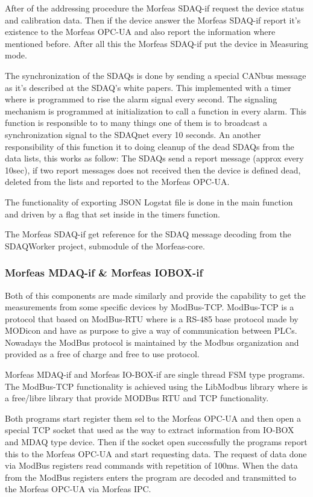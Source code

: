 \documentclass{article}
\begin{document}
After of the addressing procedure the Morfeas SDAQ-if request the device status and calibration data. Then if the device answer the Morfeas SDAQ-if report it's existence to the Morfeas OPC-UA
and also report the information where mentioned before. After all this the Morfeas SDAQ-if put the device in Measuring mode.

The synchronization of the SDAQs is done by sending a special CANbus message as it's described at the SDAQ's white papers. This implemented with a timer where is programmed to rise the alarm signal every second.
The signaling mechanism is programmed at initialization to call a function in every alarm. This function is responsible to to many things one of them is to broadcast a synchronization signal to the SDAQnet every 10 seconds.
An another responsibility of this function it to doing cleanup of the dead SDAQs from the data lists, this works as follow: The SDAQs send a report message (approx every 10sec),
if two report messages does not received then the device is defined dead, deleted from the lists and reported to the Morfeas OPC-UA.

The functionality of exporting JSON Logstat file is done in the main function and driven by a flag that set inside in the timers function.

The Morfeas SDAQ-if get reference for the SDAQ message decoding from the SDAQWorker project, submodule of the Morfeas-core.
\subsubsection{Morfeas MDAQ-if \& Morfeas IOBOX-if}
Both of this components are made similarly and provide the capability to get the measurements from some specific devices by ModBus-TCP. ModBus-TCP is a protocol that based on ModBus-RTU where is a RS-485 base protocol made by MODicon and have
as purpose to give a way of communication between PLCs. Nowadays the ModBus protocol is maintained by the Modbus organization and provided as a free of charge and free to use protocol.

Morfeas MDAQ-if and Morfeas IO-BOX-if are single thread FSM type programs. The ModBus-TCP functionality is achieved using the LibModbus library where is a free/libre library that provide MODBus RTU and TCP functionality.

Both programs start register them sel to the Morfeas OPC-UA and then open a special TCP socket that used as the way to extract information from IO-BOX and MDAQ type device. Then if the socket open successfully the programs report this to the Morfeas OPC-UA
and start requesting data. The request of data done via ModBus registers read commands with repetition of 100ms. When the data from the ModBus registers enters the program are decoded and transmitted to the Morfeas OPC-UA via Morfeas IPC.
\end{document}

